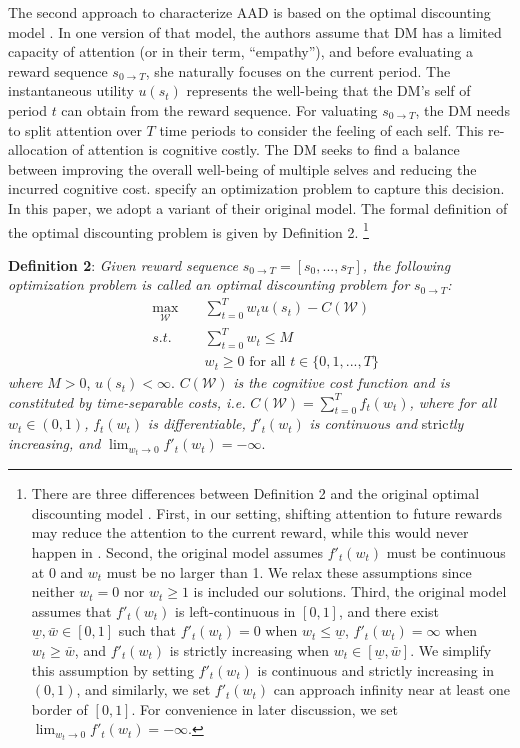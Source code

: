 \documentclass[
  12pt,
]{article}
\begin{document}
The second approach to characterize AAD is based on the optimal
discounting model \citep{noor2022optimal,noor2024constrained}. In one
version of that model, the authors assume that DM has a limited capacity
of attention (or in their term, ``empathy''), and before evaluating a
reward sequence \(s_{0\rightarrow T}\), she naturally focuses on the
current period. The instantaneous utility \(u(s_t)\) represents the
well-being that the DM's self of period \(t\) can obtain from the reward
sequence. For valuating \(s_{0\rightarrow T}\), the DM needs to split
attention over \(T\) time periods to consider the feeling of each self.
This re-allocation of attention is cognitive costly. The DM seeks to
find a balance between improving the overall well-being of multiple
selves and reducing the incurred cognitive cost.
\citet{noor2022optimal,noor2024constrained} specify an optimization
problem to capture this decision. In this paper, we adopt a variant of
their original model. The formal definition of the optimal discounting
problem is given by Definition 2. \footnote{There are three differences
  between Definition 2 and the original optimal discounting model
  \citep{noor2022optimal,noor2024constrained}. First, in our setting,
  shifting attention to future rewards may reduce the attention to the
  current reward, while this would never happen in
  \citet{noor2022optimal,noor2024constrained}. Second, the original
  model assumes \(f'_t(w_t)\) must be continuous at 0 and \(w_t\) must
  be no larger than 1. We relax these assumptions since neither
  \(w_t=0\) nor \(w_t\geq1\) is included our solutions. Third, the
  original model assumes that \(f'_t(w_t)\) is left-continuous in
  \([0,1]\), and there exist \(\underline{w},\bar{w}\in[0,1]\) such that
  \(f'_t(w_t)=0\) when \(w_t\leq\underline{w}\), \(f'_t(w_t)=\infty\)
  when \(w_t\geq\bar{w}\), and \(f'_t(w_t)\) is strictly increasing when
  \(w_t \in [\underline{w},\bar{w}]\). We simplify this assumption by
  setting \(f'_t(w_t)\) is continuous and strictly increasing in
  \((0,1)\), and similarly, we set \(f'_t(w_t)\) can approach infinity
  near at least one border of \([0,1]\). For convenience in later
  discussion, we set \(\lim_{w_t\rightarrow 0} f'_t(w_t)=-\infty\).}

\noindent \textbf{Definition 2}: \emph{Given reward sequence}
\(s_{0\rightarrow T}=[s_0,...,s_T]\)\emph{, the following optimization
problem is called an optimal discounting problem for}
\(s_{0\rightarrow T}\)\emph{:}\[\tag{3}
\begin{aligned}
&\max_{\mathcal{W}}\;&&\sum_{t=0}^T w_tu(s_t) - C(\mathcal{W}) \\
&s.t.\; &&\sum_{t=0}^Tw_t \leq M \\
&&& w_t \geq 0 \text{ for all } t\in \{0,1,...,T\}
\end{aligned}
\]\emph{where} \(M>0\), \(u(s_t)<\infty\). \(C(\mathcal{W})\) \emph{is
the cognitive cost function and is constituted by time-separable costs,
i.e.} \(C(\mathcal{W})=\sum_{t=0}^Tf_t(w_t)\)\emph{, where for all}
\(w_t\in(0,1)\)\emph{,} \(f_t(w_t)\) \emph{is differentiable,}
\(f'_t(w_t)\) \emph{is continuous and} stric\emph{tly increasing, and}
\(\lim_{w_t\rightarrow 0} f'_t(w_t)=-\infty\).
\end{document}
